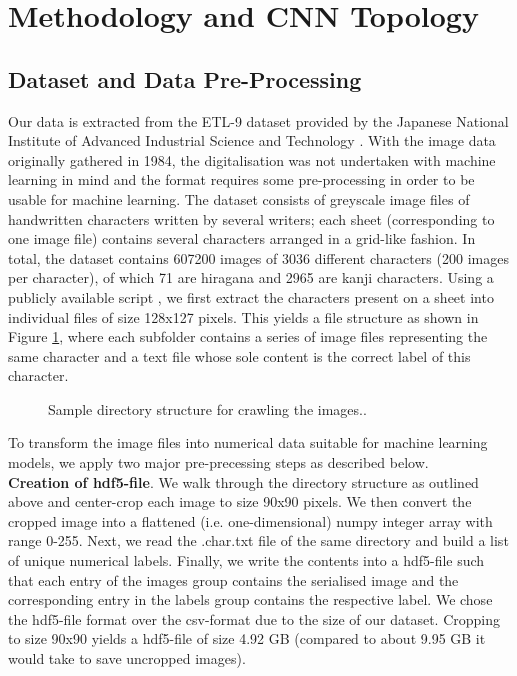 \documentclass[british,12p]{article}
\begin{document}
    \section{Methodology and CNN Topology}
    \subsection{Dataset and Data Pre-Processing}\label{secPreProcess}
    Our data is extracted from the ETL-9 dataset provided by the Japanese National Institute of Advanced Industrial Science and Technology \cite{aist:14}. With the image data originally gathered in 1984, the digitalisation was not undertaken with machine learning in mind and the format requires some pre-processing in order to be usable for machine learning. The dataset consists of greyscale image files of handwritten characters written by several writers; each sheet (corresponding to one image file) contains several characters arranged in a grid-like fashion. In total, the dataset contains 607200 images of 3036 different characters (200 images per character), of which 71 are hiragana and 2965 are kanji characters.
    	Using a publicly available script \cite{etl:19}, we first extract the characters present on a sheet into individual files of size 128x127 pixels. This yields a file structure as shown in Figure \ref{fig-directory-structure}, where each subfolder contains a series of image files representing the same character and a text file whose sole content is the correct label of this character.
    	
    	\begin{figure}[hbt]
			\begin{center}
  				\caption{Sample directory structure for crawling the images..}
  				\label{fig-directory-structure}
  			\end{center}
		\end{figure}
    	
    	To transform the image files into numerical data suitable for machine learning models, we apply two major pre-precessing steps as described below.\\
    	
    	
    	\textbf{Creation of hdf5-file}. We walk through the directory structure as outlined above and center-crop each image to size 90x90 pixels. We then convert the cropped image into a flattened (i.e. one-dimensional) numpy integer array with range 0-255. Next, we read the .char.txt file of the same directory and build a list of unique numerical labels. Finally, we write the contents into a hdf5-file such that each entry of the images group contains the serialised image and the corresponding entry in the labels group contains the respective label. We chose the hdf5-file format over the csv-format due to the size of our dataset. Cropping to size 90x90 yields a hdf5-file of size 4.92 GB (compared to about 9.95 GB it would take to save uncropped images).\\
    	
\end{document}
